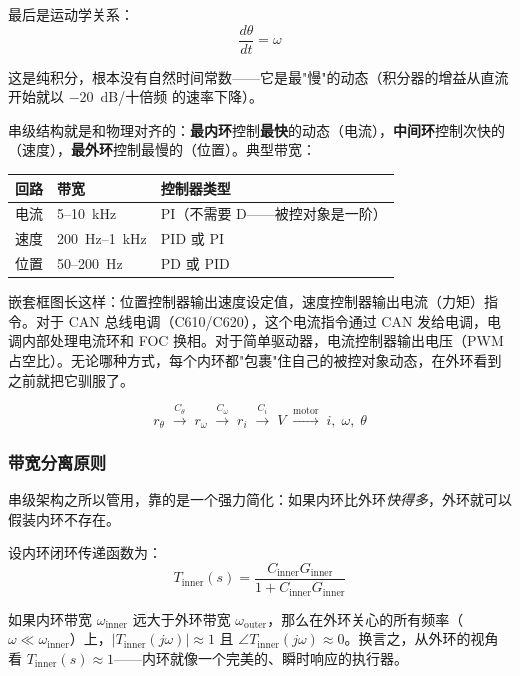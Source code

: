 最后是运动学关系：
\begin{equation}
\frac{d\theta}{dt} = \omega
\end{equation}

这是纯积分，根本没有自然时间常数——它是最"慢"的动态（积分器的增益从直流开始就以 $-20$~dB/十倍频 的速率下降）。

串级结构就是和物理对齐的：\textbf{最内环}控制\textbf{最快}的动态（电流），\textbf{中间环}控制次快的（速度），\textbf{最外环}控制最慢的（位置）。典型带宽：

\begin{center}
\begin{tabular}{l l l}
\hline
\textbf{回路} & \textbf{带宽} & \textbf{控制器类型} \\
\hline
电流 & 5--10~kHz & PI（不需要 D——被控对象是一阶） \\
速度 & 200~Hz--1~kHz & PID 或 PI \\
位置 & 50--200~Hz & PD 或 PID \\
\hline
\end{tabular}
\end{center}

嵌套框图长这样：位置控制器输出速度设定值，速度控制器输出电流（力矩）指令。对于 CAN 总线电调（C610/C620），这个电流指令通过 CAN 发给电调，电调内部处理电流环和 FOC 换相。对于简单驱动器，电流控制器输出电压（PWM 占空比）。无论哪种方式，每个内环都"包裹"住自己的被控对象动态，在外环看到之前就把它驯服了。

\begin{equation}
r_\theta \;\xrightarrow{C_\theta}\; r_\omega \;\xrightarrow{C_\omega}\; r_i \;\xrightarrow{C_i}\; V \;\xrightarrow{\text{motor}}\; i,\;\omega,\;\theta
\end{equation}

\subsubsection{带宽分离原则}

串级架构之所以管用，靠的是一个强力简化：如果内环比外环\textit{快得多}，外环就可以假装内环不存在。

设内环闭环传递函数为：
\begin{equation}
T_{\text{inner}}(s) = \frac{C_{\text{inner}} G_{\text{inner}}}{1 + C_{\text{inner}} G_{\text{inner}}}
\end{equation}

如果内环带宽 $\omega_{\text{inner}}$ 远大于外环带宽 $\omega_{\text{outer}}$，那么在外环关心的所有频率（$\omega \ll \omega_{\text{inner}}$）上，$|T_{\text{inner}}(j\omega)| \approx 1$ 且 $\angle T_{\text{inner}}(j\omega) \approx 0$。换言之，从外环的视角看 $T_{\text{inner}}(s) \approx 1$——内环就像一个完美的、瞬时响应的执行器。

